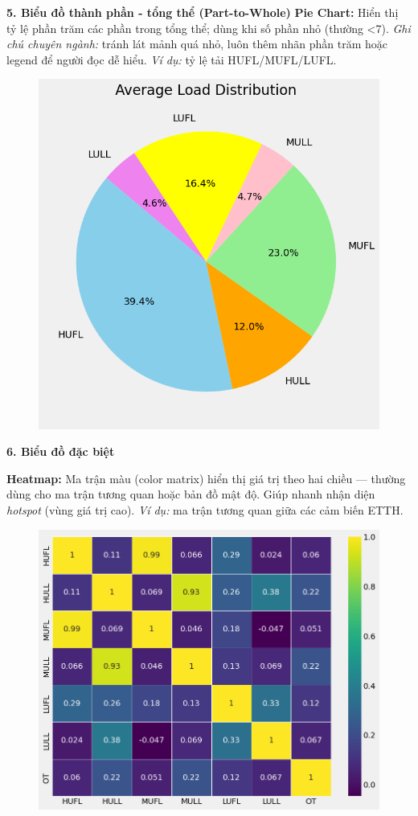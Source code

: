 \documentclass[11pt]{article}
\begin{document}
\medskip
\noindent \textbf{5. Biểu đồ thành phần - tổng thể (Part-to-Whole)}
\medskip
\textbf{Pie Chart:} Hiển thị tỷ lệ phần trăm các phần trong tổng thể; dùng khi số phần nhỏ (thường <7).
\textit{Ghi chú chuyên ngành:} tránh lát mảnh quá nhỏ, luôn thêm nhãn phần trăm hoặc legend để người đọc dễ hiểu.
\textit{Ví dụ:} tỷ lệ tải HUFL/MUFL/LUFL.
\begin{figure}[H]
    \centering
    \includegraphics[width=0.5\linewidth]{images/PieC.png}
\end{figure}

\medskip
\noindent \textbf{6. Biểu đồ đặc biệt}

\medskip
\textbf{Heatmap:} Ma trận màu (color matrix) hiển thị giá trị theo hai chiều — thường dùng cho ma trận tương quan hoặc bản đồ mật độ. Giúp nhanh nhận diện \emph{hotspot} (vùng giá trị cao).
\textit{Ví dụ:} ma trận tương quan giữa các cảm biến ETTH.
\begin{figure}[H]
    \centering
    \includegraphics[width=0.5\linewidth]{images/heatmap.png}
\end{figure}
\end{document}
